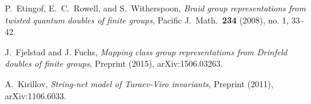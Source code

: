 \documentclass{amsart}
\begin{document}
\begin{thebibliography}{9999}
 P.\ Etingof, E.\ C.\ Rowell, and S.\ Witherspoon, \emph{Braid group representations from twisted quantum doubles of finite groups}, Pacific J.\ Math.\ \textbf{234} (2008), no. 1, 33--42.

 J.\ Fjelstad and J. Fuchs, \emph{Mapping class group representations from {Drinfeld} doubles of finite groups}, Preprint (2015), arXiv:1506.03263.










 A.\ Kirillov, \emph{String-net model of {Turaev-Viro} invariants}, Preprint (2011), arXiv:1106.6033.


\end{thebibliography}
\end{document}
